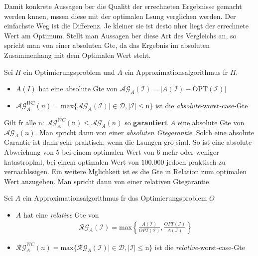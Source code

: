 \documentclass[12pt, a4paper, twoside]{scrartcl}
\begin{document}
Damit konkrete Aussagen ber die Qualitt der errechneten Ergebnisse gemacht werden knnen, mssen diese mit der optimalen Lsung verglichen werden. Der einfachste Weg ist die Differenz. Je kleiner sie ist desto nher liegt der errechnete Wert am Optimum. Stellt man Aussagen ber diese Art des Vergleichs an, so spricht man von einer absoluten Gte, da das Ergebnis im absoluten Zusammenhang mit dem Optimalen Wert steht.

\begin{definition}
	Sei $\Pi$ ein Optimierungsproblem und $A$ ein Approximationsalgorithmus fr $\Pi$. 
	\begin{itemize}
		\item $A(I)$ hat eine absolute Gte von $\mathcal{AG}_{A}(\mathcal I)=|A(\mathcal I)-\text{OPT}(\mathcal I)|$
		\item $\mathcal{AG}_{A}^{WC}(n) = \text{max}\{\mathcal{AG}_{A}(\mathcal I)|\in \mathcal D,|\mathcal I| \leq \text{n}\}$ ist die \emph{absolute}-worst-case-Gte
	\end{itemize}
\end{definition}

Gilt fr alle n: $\mathcal{AG}_{A}^{WC}(\text{n}) \leq \mathcal{AG}_{A}(n)$ so \textbf{garantiert} $A$ eine absolute Gte von $\mathcal{AG}_{A}(n)$. Man spricht dann von einer \emph{absoluten Gtegarantie}. Solch eine absolute Garantie ist dann sehr praktisch, wenn die Lsungen gro sind. So ist eine absolute Abweichung von 5 bei einem optimalen Wert von 6 mehr oder weniger katastrophal, bei einem optimalen Wert von $100.000$ jedoch praktisch zu vernachlssigen. Ein weitere Mglichkeit ist es die Gte in Relation zum optimalen Wert anzugeben. Man spricht dann von einer relativen Gtegarantie.

\begin{definition}
	Sei $A$ ein Approximationsalgorithmus fr das Optimierungsproblem $O$
	\begin{itemize}
		\item $A$ hat eine \emph{relative} Gte von
		\begin{align}
			\mathcal{RG}_{A}(\mathcal I)=\text{max}\left\{
				\frac{A(\mathcal I)}{OPT(\mathcal I)},\frac{OPT(\mathcal I)}{A(\mathcal I)}
				\right\}
		\end{align}
		\item  $\mathcal{RG}_{A}^{WC}(n) = \text{max}\{\mathcal{RG}_{A}(\mathcal I)|\in \mathcal D,|\mathcal I| \leq \text{n}\}$ ist die \emph{relative}-worst-case-Gte
	\end{itemize}
\end{definition}
\end{document}
